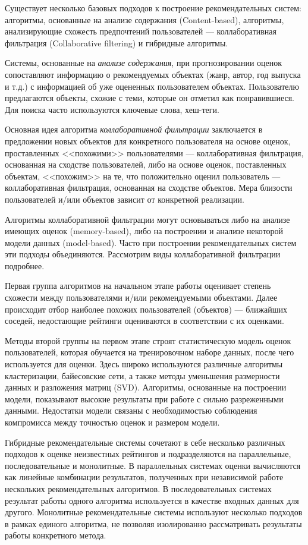 \documentclass[a4paper, 12pt]{article} %
\begin{document}
\par
Существует несколько базовых подходов к построение рекомендательных систем: алгоритмы, основанные на анализе содержания (Content-based), алгоритмы, анализирующие схожесть предпочтений пользователей --- коллаборативная фильтрация (Collaborative filtering) и гибридные алгоритмы. 
\par
Системы, основанные на \textit{анализе содержания}, при прогнозировании оценок сопоставляют информацию о рекомендуемых объектах (жанр, автор, год выпуска и т.д.) с информацией об уже оцененных пользователем объектах. Пользователю предлагаются объекты, схожие с теми, которые он отметил как понравившиеся. Для поиска часто используются ключевые слова, хеш-теги. 
\par
Основная идея алгоритма \textit{коллаборативной фильтрации} заключается в предложении новых объектов для конкретного пользователя на основе оценок, проставленных <<похожими>> пользователями --- коллаборативная фильтрация, основанная на сходстве пользователей, либо на основе оценок, поставленных объектам, <<похожим>> на те, что положительно оценил пользователь --- коллаборативная фильтрация, основанная на сходстве объектов. Мера близости пользователей и/или объектов зависит от конкретной реализации. 
\par
Алгоритмы коллаборативной фильтрации могут основываться либо на анализе имеющих оценок (memory-based), либо на построении и анализе некоторой модели данных (model-based). Часто при построении рекомендательных систем эти подходы объединяются. Рассмотрим виды коллаборативной фильтрации подробнее.
\par
Первая группа алгоритмов на начальном этапе работы оценивает степень схожести между пользователями и/или рекомендуемыми объектами. Далее происходит отбор наиболее похожих пользователей (объектов) --- ближайших соседей, недостающие рейтинги оцениваются в соответствии с их оценками. 
\par
Методы второй группы на первом этапе строят статистическую модель оценок пользователей, которая обучается на тренировочном наборе данных, после чего используется для оценки. Здесь широко используются различные алгоритмы кластеризации, байесовские сети, а также методы уменьшения размерности данных и разложения матриц (SVD). Алгоритмы, основанные на построении  модели, показывают высокие результаты при работе с сильно разреженными данными. Недостатки модели связаны с необходимостью соблюдения компромисса между точностью оценок и размером модели.

\par
Гибридные рекомендательные системы сочетают в себе несколько различных подходов к оценке неизвестных рейтингов и подразделяются на параллельные, последовательные и монолитные. В параллельных системах оценки вычисляются как линейные комбинации результатов, полученных при независимой работе нескольких рекомендательных алгоритмов. В последовательных системах результат работы одного алгоритма используется в качестве входных данных для другого. Монолитные рекомендательные  системы используют несколько подходов в рамках единого алгоритма, не позволяя изолированно рассматривать результаты работы конкретного метода.
\end{document}
